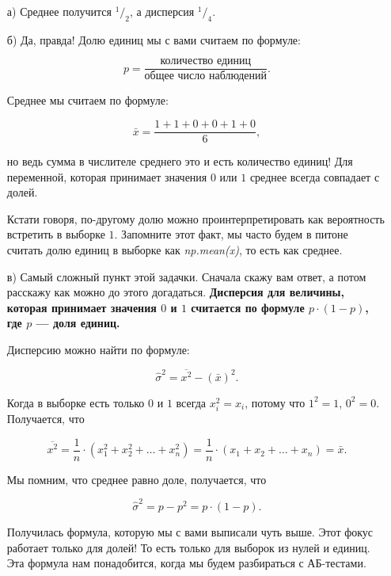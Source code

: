 \documentclass[12pt, a4paper, oneside]{article}
\newcommand{\fr}[2]{\ensuremath{^{#1}/_{#2}}}   %
\theoremstyle{plain} %
\theoremstyle{definition}
\newcommand{\indef}[1]{\textbf{ \color{green} #1}}
\begin{document}
\begin{solution}
\begin{enumerate}
    \item[а)] Среднее получится $\fr{1}{2}$, а дисперсия $\fr{1}{4}$.
    \item[б)] Да, правда! Долю единиц мы с вами считаем по формуле: 
    
    $$
    p = \frac{\text{количество единиц}}{\text{общее число наблюдений}}.
    $$
    
    Среднее мы считаем по формуле: 
    
    $$
    \bar x = \frac{1 + 1 + 0 + 0 + 1 + 0}{6},
    $$
    
    но ведь сумма в числителе среднего это и есть количество единиц! Для переменной, которая принимает значения $0$ или $1$ среднее всегда совпадает с долей.
    
    Кстати говоря, по-другому долю можно проинтерпретировать как вероятность встретить в выборке $1$. Запомните этот факт, мы часто будем в питоне считать долю единиц в выборке как \textit{np.mean(x)}, то есть как среднее.

    \item[в)] Самый сложный пункт этой задачки. Сначала скажу вам ответ, а потом расскажу как можно до этого догадаться. \indef{Дисперсия для величины, которая принимает значения $0$ и $1$ считается по формуле $p \cdot (1 - p)$, где $p$ --- доля единиц.}
    
    Дисперсию можно найти по формуле: 
    
    $$
    \hat \sigma^2 = \overline{x^2} - (\bar x)^2.
    $$
    
    Когда в выборке есть только $0$ и $1$ всегда $x_i^2 = x_i$, потому что $1^2 = 1$, $0^2 = 0$. Получается, что 
    
    $$
    \overline{x^2} = \frac{1}{n} \cdot (x_1^2 + x_2^2 + \ldots + x_n^2) = \frac{1}{n} \cdot (x_1 + x_2 + \ldots + x_n) = \bar x.  
    $$
    
    Мы помним, что среднее равно доле, получается, что 
    
     $$
    \hat \sigma^2 = p - p^2 = p \cdot (1-p).
    $$
    
    Получилась формула, которую мы с вами выписали чуть выше. Этот фокус работает только для долей! То есть только для выборок из нулей и единиц. Эта формула нам понадобится, когда мы будем разбираться с АБ-тестами. 
\end{enumerate}
\end{solution}
\end{document}
